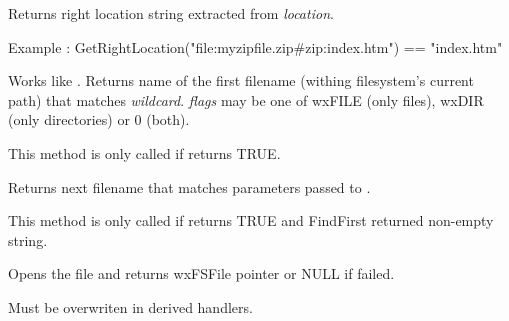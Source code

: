 Returns right location string extracted from {\it location}. 

Example : GetRightLocation("file:myzipfile.zip\#zip:index.htm") == "index.htm"





\label{wxfilesystemfindfirst}


Works like . Returns name of the first
filename (withing filesystem's current path) that matches {\it wildcard}. {\it flags} may be one of
wxFILE (only files), wxDIR (only directories) or 0 (both).

This method is only called if  returns TRUE.

\label{wxfilesystemfindnext}


Returns next filename that matches parameters passed to .

This method is only called if  returns TRUE and FindFirst
returned non-empty string.



\label{wxfilesystemhandleropenfile}


Opens the file and returns wxFSFile pointer or NULL if failed.

Must be overwriten in derived handlers.




